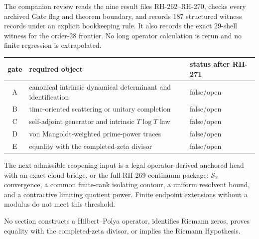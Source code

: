 \documentclass[11pt]{article}
\theoremstyle{remark}
\begin{document}
The companion review reads the nine result files RH-262--RH-270, checks every
archived Gate flag and theorem boundary, and records 187 structured witness
records under an explicit bookkeeping rule.  It also records the exact
29-shell witness for the order-28 frontier.  No long operator calculation is
rerun and no finite regression is extrapolated.

\begin{center}
\begin{tabular}{cll}
\toprule
gate & required object & status after RH-271\\
\midrule
A & canonical intrinsic dynamical determinant and identification & false/open\\
B & time-oriented scattering or unitary completion & false/open\\
C & self-adjoint generator and intrinsic $T\log T$ law & false/open\\
D & von Mangoldt-weighted prime-power traces & false/open\\
E & equality with the completed-zeta divisor & false/open\\
\bottomrule
\end{tabular}
\end{center}

The next admissible reopening input is a legal operator-derived anchored head
with an exact cloud bridge, or the full RH-269 continuum package:
$\mathcal S_2$ convergence, a common finite-rank isolating contour, a uniform
resolvent bound, and a contractive limiting quotient power.  Finite endpoint
extensions without a modulus do not meet this threshold.

No section constructs a Hilbert--Polya operator, identifies Riemann zeros,
proves equality with the completed-zeta divisor, or implies the Riemann
Hypothesis.



\end{document}
